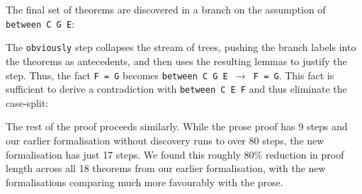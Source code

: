 The final set of theorems are discovered in a branch on the assumption of \texttt{between C G E}:

\vspace{0.2cm}
\noindent{}
\vspace{0.1cm}

The \texttt{obviously} step collapses the stream of trees, pushing the branch labels into the theorems as antecedents, and then uses the resulting lemmas to justify the step. Thus, the fact \texttt{F = G} becomes \texttt{between C G E $\rightarrow$ F = G}. This fact is sufficient to derive a contradiction with \texttt{between C E F} and thus eliminate the case-split:

\vspace{0.2cm}
\noindent{}
\vspace{0.1cm}

The rest of the proof proceeds similarly. While the prose proof has 9 steps and our earlier formalisation without discovery runs to over 80 steps, the new formalisation has just 17 steps. We found this roughly 80\% reduction in proof length across all 18 theorems from our earlier formalisation, with the new formalisations comparing much more favourably with the prose.